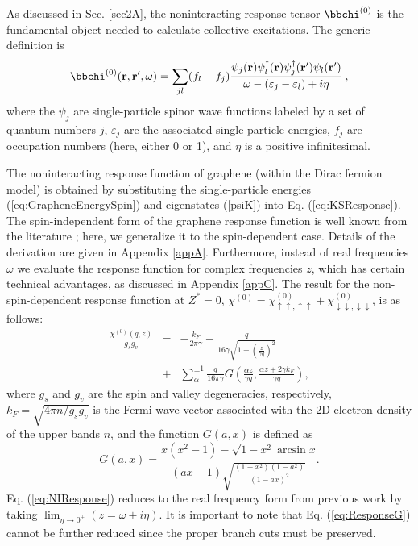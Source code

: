 \documentclass[aps,prb,twocolumn,superscriptaddress]{revtex4-2}
\newcommand{\uu}{{\uparrow\uparrow}}
\newcommand{\dd}{{\downarrow\downarrow}}
\newcommand{\kf}{k_F}
\newcommand{\bfr}{{\bf r}}
\newcommand{\bfrp}{{\bfr{'}}}
\newcommand{\w}{\omega}
\begin{document}
As discussed in Sec. \ref{sec2A}, the noninteracting response tensor $\mathbb{\bbchi}^{(0)}$ is the fundamental object needed to calculate collective excitations.
The generic definition is
\begin{equation}\label{eq:KSResponse}
  \mathbb{\bbchi}^{(0)} (\bfr,\bfrp,\w) = \sum\limits_{jl} (f_l-f_j) \frac{\psi_j(\bfr) \psi_l^\dagger(\bfr) \psi_j^\dagger(\bfrp) \psi_l(\bfrp)}
  {\w - (\varepsilon_j - \varepsilon_l) +i\eta} \:,
\end{equation}
where the $\psi_j$ are single-particle spinor wave functions labeled by a set of quantum numbers $j$, $\varepsilon_j$ are the associated single-particle energies,
$f_j$ are occupation numbers (here, either 0 or 1), and $\eta$ is a positive infinitesimal.

The noninteracting response function of graphene (within the Dirac fermion model) is obtained by substituting the single-particle
energies (\ref{eq:GrapheneEnergySpin}) and eigenstates (\ref{psiK}) into Eq. (\ref{eq:KSResponse}). The spin-independent form of the graphene response function is
well known from the literature \cite{Ando2006,Wunsch2006,Abedinpour2011}; here, we generalize it to the spin-dependent case.
Details of the derivation are given in Appendix \ref{appA}.
Furthermore, instead of real frequencies $\omega$ we evaluate the response function for complex frequencies $z$, which
has certain technical advantages, as discussed in Appendix \ref{appC}.
The result for the non-spin-dependent response function at $Z^*=0$, $\chi^{(0)} = \chi^{(0)}_{\uu,\uu} + \chi^{(0)}_{\dd,\dd}$,
is as follows:
\begin{eqnarray}\label{eq:NIResponse}
\frac{\chi^{(0)}(q,z)}{g_s g_v} &=&
-\frac{\kf}{2\pi\gamma} -\frac{q}{16 \gamma \sqrt{1-\left(\frac{z}{\gamma q}\right)^2}} \nonumber\\
&+&
\sum_{\alpha  }^{\pm 1}\frac{ q }{16\pi\gamma }  G\left(\frac{\alpha z}{\gamma q},\frac{\alpha z +2 \gamma \kf}{\gamma q}\right),
\end{eqnarray}
where $g_s$ and $g_v$ are the spin and valley degeneracies, respectively,
$\kf=\sqrt{4\pi n/g_s g_v}$ is the Fermi wave vector associated with the 2D electron density of the upper bands $n$,
and the function $G(a,x)$ is defined as
\begin{equation}\label{eq:ResponseG}
  G(a,x) = \frac{x(x^2-1)-\sqrt{1-x^2}\arcsin x}{(ax-1)\sqrt{\frac{(1-x^2)(1-a^2)}{(1-ax)^2}}} .
\end{equation}
Eq. (\ref{eq:NIResponse}) reduces to the real frequency form from previous work by taking $\lim_{\eta \to 0^+} (z= \w + i\eta)$.
It is important to note that Eq. (\ref{eq:ResponseG}) cannot be further reduced since the proper branch cuts must be preserved.
\end{document}
